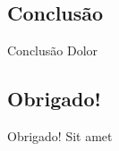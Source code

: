 \documentclass[
  ignorenonframetext,
  aspectratio=169]{beamer}
\begin{document}
\hypertarget{conclusuxe3o}{%
\subsection{Conclusão}\label{conclusuxe3o}}

\begin{frame}{Conclusão}
Dolor
\end{frame}

\hypertarget{obrigado}{%
\subsection{Obrigado!}\label{obrigado}}

\begin{frame}{Obrigado!}
Sit amet
\end{frame}
\end{document}
